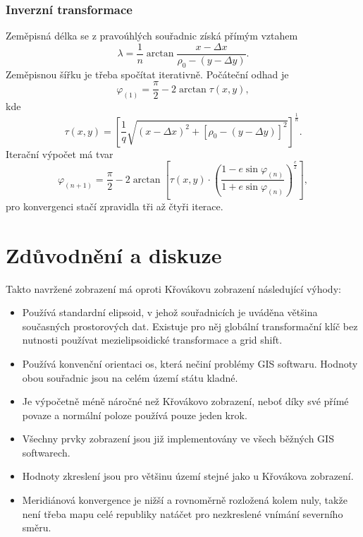 \documentclass[a4paper]{article}
\begin{document}
\subsubsection{Inverzní transformace}
Zeměpisná délka se z pravoúhlých souřadnic získá přímým vztahem
\begin{equation*}
\lambda = \frac{1}{n} \arctan{\frac{x - \Delta x}{\rho_0 - (y - \Delta y)}}.
\end{equation*}
Zeměpisnou šířku je třeba spočítat iterativně. Počáteční odhad je
\begin{equation*}
\varphi_{(1)} = \frac{\pi}{2} - 2 \arctan{\tau(x,y)},
\end{equation*}
kde
\begin{equation*}
\tau(x,y) = \left[\frac{1}{q}\sqrt{(x - \Delta x)^2 + [\rho_0 - (y - \Delta y)]^2}\right]^{\frac{1}{n}}.
\end{equation*}
Iterační výpočet má tvar
\begin{equation*}
\varphi_{(n+1)} = \frac{\pi}{2} - 2 \arctan{\left[\tau(x,y) \cdot \left(\frac{1-e\sin{\varphi_{(n)}}}{1+e\sin{\varphi_{(n)}}}\right)^{\frac{e}{2}}\right]},
\end{equation*}
pro konvergenci stačí zpravidla tři až čtyři iterace.

\section{Zdůvodnění a diskuze}
Takto navržené zobrazení má oproti Křovákovu zobrazení následující výhody:
\begin{itemize}
  \item Používá standardní elipsoid, v jehož souřadnicích je uváděna většina současných prostorových dat. Existuje pro něj globální transformační klíč bez nutnosti používat mezielipsoidické transformace a grid shift.
  \item Používá konvenční orientaci os, která nečiní problémy GIS softwaru. Hodnoty obou souřadnic jsou na celém území státu kladné.
  \item Je výpočetně méně náročné než Křovákovo zobrazení, neboť díky své přímé povaze a normální poloze používá pouze jeden krok.
  \item Všechny prvky zobrazení jsou již implementovány ve všech běžných GIS softwarech. 
  \item Hodnoty zkreslení jsou pro většinu území stejné jako u Křovákova zobrazení.
  \item Meridiánová konvergence je nižší a rovnoměrně rozložená kolem nuly, takže není třeba mapu celé republiky natáčet pro nezkreslené vnímání severního směru.
\end{itemize}
\end{document}
